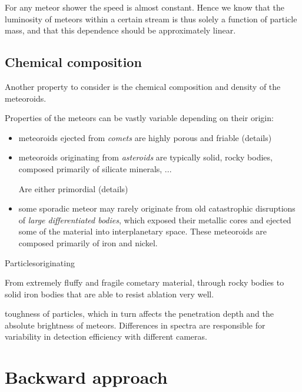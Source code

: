         For any meteor shower the speed is almost constant. Hence we know that the luminosity of meteors
        within a certain stream is thus solely a function of particle mass, and that this dependence should
        be approximately linear.

    \subsection{Chemical composition} \label{mac}
        Another property to consider is the chemical composition and density of the meteoroids.


        Properties of the meteors can be vastly variable depending on their origin:
        \begin{itemize}
            \item meteoroids ejected from \emph{comets} are highly porous and friable
                (details)
            \item meteoroids originating from \emph{asteroids} are typically solid,
                rocky bodies, composed primarily of silicate minerals, ...

                Are either primordial
                (details)
            \item some sporadic meteor may rarely originate from old catastrophic disruptions
                of \emph{large differentiated bodies}, which exposed their metallic cores
                and ejected some of the material into interplanetary space.
                These meteoroids are composed primarily of iron and nickel.
        \end{itemize}
        Particlesoriginating

        From extremely fluffy and fragile cometary material, through rocky bodies
        to solid iron bodies that are able to resist ablation very well.

        toughness of particles, which in turn affects the penetration depth
        and the absolute brightness of meteors.
        Differences in spectra are responsible for variability in detection efficiency with different cameras.


\section{Backward approach} \label{ab}

